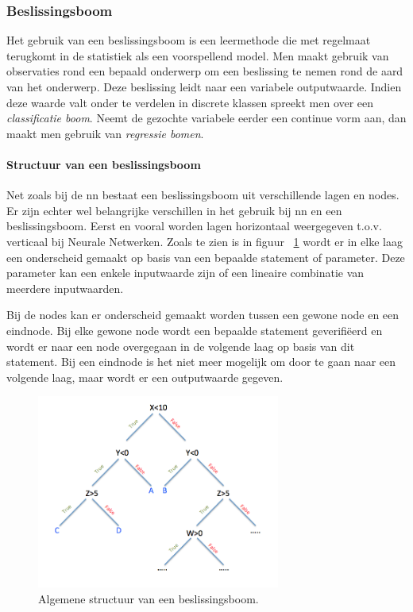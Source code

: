 	\subsubsection{Beslissingsboom} 
	Het gebruik van een beslissingsboom is een leermethode die met regelmaat terugkomt in de statistiek als een voorspellend model. Men maakt gebruik van observaties rond een bepaald onderwerp om een beslissing te nemen rond de aard van het onderwerp. Deze beslissing leidt naar een variabele outputwaarde. Indien deze waarde valt onder te verdelen in discrete klassen spreekt men over een \textit{classificatie boom}. Neemt de gezochte variabele eerder een continue vorm aan, dan maakt men gebruik van \textit{regressie bomen}.
	

	
		\paragraph{Structuur van een beslissingsboom}
		
		
		Net zoals bij de \gls{nn} bestaat een beslissingsboom uit verschillende lagen en nodes. Er zijn echter wel belangrijke verschillen in het gebruik bij \gls{nn} en een beslissingsboom. Eerst en vooral worden lagen horizontaal weergegeven t.o.v. verticaal bij Neurale Netwerken. Zoals te zien is in figuur ~\ref{fig:beslissingsBoom} wordt er in elke laag een onderscheid gemaakt op basis van een bepaalde statement of parameter. Deze parameter kan een enkele inputwaarde zijn of een lineaire combinatie van meerdere inputwaarden. 
		
		Bij de nodes kan er onderscheid gemaakt worden tussen een gewone node en een eindnode. Bij elke gewone node wordt een bepaalde statement geverifi\"eerd en wordt er naar een node overgegaan in de volgende laag op basis van dit statement. Bij een eindnode is het niet meer mogelijk om door te gaan naar een volgende laag, maar wordt er een outputwaarde gegeven.
		
		\begin{figure}
			\centering
			\includegraphics[width=80mm]{afbeeldingen/beslissingsBoom.PNG}
			\caption{Algemene structuur van een beslissingsboom.\citep{bron:beslissingsboom}}
			\label{fig:beslissingsBoom}
		\end{figure}
		
